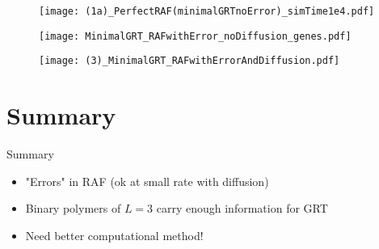 \documentclass{beamer}
\begin{document}
\begin{frame}
\begin{figure}
    \centering
    	\texttt{[image: (1a)\_PerfectRAF(minimalGRTnoError)\_simTime1e4.pdf]}
	\label{fig:spaceAsFood}
\end{figure}
\end{frame}

\begin{frame}
\begin{figure}
    \centering
    	\texttt{[image: MinimalGRT\_RAFwithError\_noDiffusion\_genes.pdf]}
	\label{fig:minGRTnoDiffusion}
\end{figure}
\end{frame}

\begin{frame}
\begin{figure}
    \centering
    	\texttt{[image: (3)\_MinimalGRT\_RAFwithErrorAndDiffusion.pdf]}
	\label{fig:minGRT}
\end{figure}
\end{frame}





\section*{Summary}

\begin{frame}{Summary}
  \begin{itemize}
  \item "Errors" in RAF (ok at small rate with diffusion)
  \item Binary polymers of $L=3$ carry enough information for GRT
  \item Need better computational method!
  \end{itemize}
\end{frame}
\end{document}
